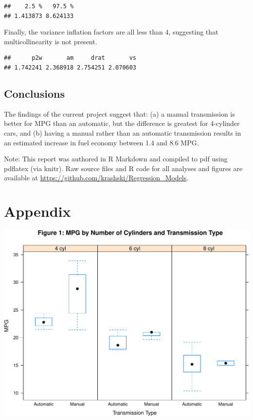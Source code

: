 \documentclass[]{article}
\begin{document}
\begin{verbatim}
##    2.5 %   97.5 % 
## 1.413873 8.624133
\end{verbatim}

Finally, the variance inflation factors are all less than 4, suggesting
that multicollinearity is not present.

\begin{verbatim}
##      p2w       am     drat       vs 
## 1.742241 2.368918 2.754251 2.070603
\end{verbatim}

\subsection{Conclusions}\label{conclusions}

The findings of the current project suggest that: (a) a manual
transmission is better for MPG than an automatic, but the difference is
greatest for 4-cylinder cars, and (b) having a manual rather than an
automatic transmission results in an estimated increase in fuel economy
between 1.4 and 8.6 MPG.

Note: This report was authored in R Markdown and compiled to pdf using
pdflatex (via knitr). Raw source files and R code for all analyses and
figures are available at
\url{https://github.com/krashski/Regression_Models}.

\section{Appendix}\label{appendix}

\includegraphics{mtcars_files/figure-latex/boxplot-1.pdf}
\end{document}

